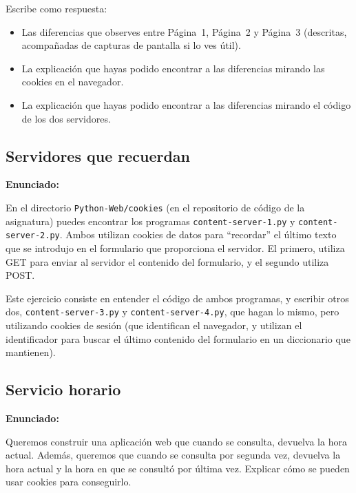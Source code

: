 Escribe como respuesta:

\begin{itemize}
\item Las diferencias que observes entre Página~1, Página~2 y Página~3 (descritas, acompañadas de capturas de pantalla si lo ves útil).
\item La explicación que hayas podido encontrar a las diferencias mirando las cookies en el navegador.
\item La explicación que hayas podido encontrar a las diferencias mirando el código de los dos servidores.  
\end{itemize}

\subsection{Servidores que recuerdan}
\label{subsec:servidores-recuerdan}

\textbf{Enunciado:}

En el directorio \verb|Python-Web/cookies| (en el repositorio de código de la asignatura) puedes encontrar los programas \verb|content-server-1.py| y \verb|content-server-2.py|. Ambos utilizan cookies de datos para ``recordar'' el último texto que se introdujo en el formulario que proporciona el servidor. El primero, utiliza GET para enviar al servidor el contenido del formulario, y el segundo utiliza POST.

Este ejercicio consiste en entender el código de ambos programas, y escribir otros dos, \verb|content-server-3.py| y \verb|content-server-4.py|, que hagan lo mismo, pero utilizando cookies de sesión (que identifican el navegador, y utilizan el identificador para buscar el último contenido del formulario en un diccionario que mantienen).

\subsection{Servicio horario}
\label{subsec:ej-servicio-horario}

\textbf{Enunciado:}

Queremos construir una aplicación web que cuando se consulta, devuelva la hora actual. Además, queremos que cuando se consulta por segunda vez, devuelva la hora actual y la hora en que se consultó por última vez. Explicar cómo se pueden usar cookies para conseguirlo.

